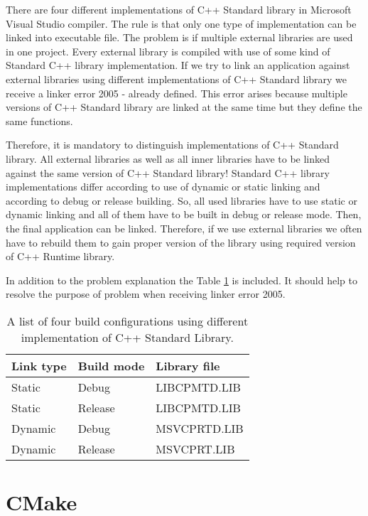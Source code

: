 There are four different implementations of C++ Standard library in Microsoft Visual Studio compiler. The rule is that only one type of implementation can be linked into executable file. The problem is if multiple external libraries are used in one project. Every external library is compiled with use of some kind of Standard C++ library implementation. If we try to link an application against external libraries using different implementations of C++ Standard library we receive a linker error 2005 - already defined. This error arises because multiple versions of C++ Standard library are linked at the same time but they define the same functions.

Therefore, it is mandatory to distinguish implementations of C++ Standard library. All external libraries as well as all inner libraries have to be linked against the same version of C++ Standard library! Standard C++ library implementations differ according to use of dynamic or static linking and according to debug or release building. So, all used libraries have to use static or dynamic linking and all of them have to be built in debug or release mode. Then, the final application can be linked. Therefore, if we use external libraries we often have to rebuild them to gain proper version of the library using required version of C++ Runtime library.

In addition to the problem explanation the Table \ref{standardlibrarytable} is included. It should help to resolve the purpose of problem when receiving linker error 2005. 

\begin{table}
  \caption{A list of four build configurations using different implementation of C++ Standard Library.}
  \label{standardlibrarytable}
	\begin{tabular}{| l| l | l |}
	  \hline                       
	  Link type & Build mode & Library file \\
	  \hline
	  \hline                     
	  Static & Debug & LIBCPMTD.LIB\\
	  \hline
	  Static & Release & LIBCPMTD.LIB\\
	  \hline  
	  Dynamic & Debug & MSVCPRTD.LIB\\
	  \hline  
	  Dynamic & Release & MSVCPRT.LIB\\  
	  \hline  
	\end{tabular}
\end{table}


\section{CMake}


